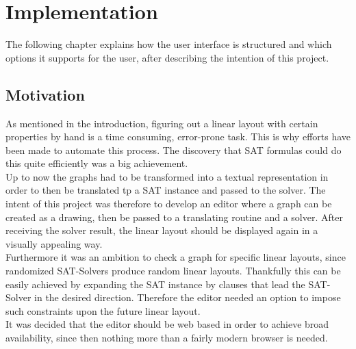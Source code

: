 
\chapter{Implementation}
  \label{Implementation}
The following chapter explains how the user interface is structured and which options it supports for the user, after describing the intention of this project.
\section{Motivation}
As mentioned in the introduction, figuring out a linear layout with certain properties by hand is a time consuming, error-prone task. This is why efforts have been made to automate this process. The discovery that SAT formulas could do this quite efficiently \cite{Bekos2015TheBE} was a big achievement.\\
Up to now the graphs had to be transformed into a textual representation in order to then be translated tp a SAT instance and passed to the solver. The intent of this project was therefore to develop an editor where a graph can be created as a drawing, then be passed to a translating routine and a solver. After receiving the solver result, the linear layout should be displayed again in a visually appealing way.\\
Furthermore it was an ambition to check a graph for specific linear layouts, since randomized SAT-Solvers produce random linear layouts. Thankfully this can be easily achieved by expanding the SAT instance by clauses that lead the SAT-Solver in the desired direction. Therefore the editor needed an option to impose such constraints upon the future linear layout.\\
It was decided that the editor should be web based in order to achieve broad availability, since then nothing more than a fairly modern browser is needed.\\

